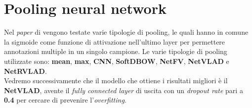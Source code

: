 \section{Pooling neural network}
Nel \textit{paper} di \citet{soccerNet} vengono testate varie tipologie di pooling, le quali hanno in comune la sigmoide come funzione di attivazione nell'ultimo layer per permettere annotazioni multiple in un singolo campione.
Le varie tipologie di pooling utilizzate sono: \textbf{mean}, \textbf{max}, \textbf{CNN}, \textbf{SoftDBOW}, \textbf{NetFV}, \textbf{NetVLAD} e \textbf{NetRVLAD}. \cite{MiechPooling}
\\Vedremo successivamente che il modello che ottiene i risultati migliori è il \textbf{NetVLAD}, avente il \textit{fully connected layer} di uscita con un \textit{dropout rate} pari a \textbf{0.4} per cercare di prevenire l'\textit{overfitting}.

